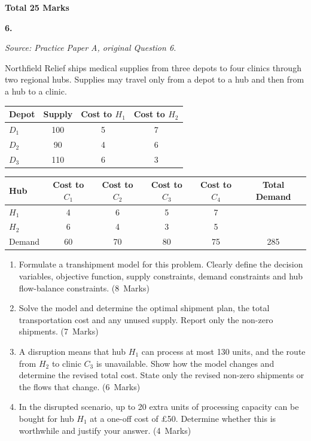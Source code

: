 \documentclass[11pt,a4paper]{article}
\newcommand{\markalloc}[1]{\nobreak\hfill\mbox{(#1 Marks)}}
\newcommand{\questiontotal}[1]{\begin{flushright}\textbf{Total #1 Marks}\end{flushright}}
\begin{document}
\questiontotal{25}

\newpage

\textbf{6.}

\textit{Source: Practice Paper A, original Question 6.}



Northfield Relief ships medical supplies from three depots to four clinics through two regional hubs.
Supplies may travel only from a depot to a hub and then from a hub to a clinic.

\begin{center}
\begin{tabular}{lccc}
\toprule
Depot & Supply & Cost to $H_1$ & Cost to $H_2$ \\
\midrule
$D_1$ & 100 & 5 & 7 \\
$D_2$ & 90 & 4 & 6 \\
$D_3$ & 110 & 6 & 3 \\
\bottomrule
\end{tabular}
\end{center}

\begin{center}
\begin{tabular}{lccccc}
\toprule
Hub & Cost to $C_1$ & Cost to $C_2$ & Cost to $C_3$ & Cost to $C_4$ & Total Demand \\
\midrule
$H_1$ & 4 & 6 & 5 & 7 & \\
$H_2$ & 6 & 4 & 3 & 5 & \\
\midrule
Demand & 60 & 70 & 80 & 75 & 285 \\
\bottomrule
\end{tabular}
\end{center}

\begin{enumerate}
\item Formulate a transhipment model for this problem. Clearly define the decision variables, objective function, supply constraints, demand constraints and hub flow-balance constraints. \markalloc{8}

\item Solve the model and determine the optimal shipment plan, the total transportation cost and any unused supply. Report only the non-zero shipments. \markalloc{7}

\item A disruption means that hub $H_1$ can process at most 130 units, and the route from $H_2$ to clinic $C_3$ is unavailable. Show how the model changes and determine the revised total cost. State only the revised non-zero shipments or the flows that change. \markalloc{6}

\item In the disrupted scenario, up to 20 extra units of processing capacity can be bought for hub $H_1$ at a one-off cost of \pounds50. Determine whether this is worthwhile and justify your answer. \markalloc{4}
\end{enumerate}
\end{document}
